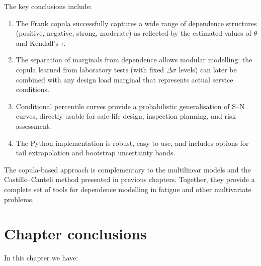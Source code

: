 The key conclusions include:

\begin{enumerate}
    \item The Frank copula successfully captures a wide range of dependence structures (positive, negative, strong, moderate) as reflected by the estimated values of \(\theta\) and Kendall's \(\tau\).
    \item The separation of marginals from dependence allows modular modelling: the copula learned from laboratory tests (with fixed \(\Delta\sigma\) levels) can later be combined with any design load marginal that represents actual service conditions.
    \item Conditional percentile curves provide a probabilistic generalisation of S–N curves, directly usable for safe-life design, inspection planning, and risk assessment.
    \item The Python implementation is robust, easy to use, and includes options for tail extrapolation and bootstrap uncertainty bands.
\end{enumerate}

The copula-based approach is complementary to the multilinear models and the Castillo–Canteli method presented in previous chapters. Together, they provide a complete set of tools for dependence modelling in fatigue and other multivariate problems.

\section*{Chapter conclusions}

In this chapter we have:

